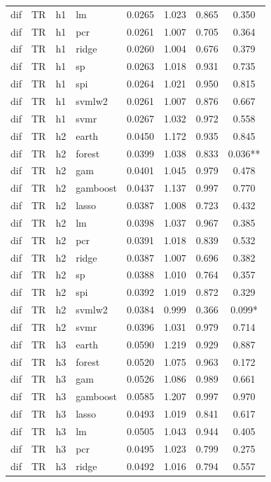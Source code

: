 \begin{ThreePartTable}
\begin{longtable}[t]{llclcccc}
dif & TR & h1 & lm & 0.0265 & 1.023 & 0.865 & 0.350\\
dif & TR & h1 & pcr & 0.0261 & 1.007 & 0.705 & 0.364\\
dif & TR & h1 & ridge & 0.0260 & 1.004 & 0.676 & 0.379\\
dif & TR & h1 & sp & 0.0263 & 1.018 & 0.931 & 0.735\\
dif & TR & h1 & spi & 0.0264 & 1.021 & 0.950 & 0.815\\
dif & TR & h1 & svmlw2 & 0.0261 & 1.007 & 0.876 & 0.667\\
dif & TR & h1 & svmr & 0.0267 & 1.032 & 0.972 & 0.558\\
\addlinespace
dif & TR & h2 & earth & 0.0450 & 1.172 & 0.935 & 0.845\\
dif & TR & h2 & forest & 0.0399 & 1.038 & 0.833 & 0.036**\\
dif & TR & h2 & gam & 0.0401 & 1.045 & 0.979 & 0.478\\
dif & TR & h2 & gamboost & 0.0437 & 1.137 & 0.997 & 0.770\\
dif & TR & h2 & lasso & 0.0387 & 1.008 & 0.723 & 0.432\\
dif & TR & h2 & lm & 0.0398 & 1.037 & 0.967 & 0.385\\
dif & TR & h2 & pcr & 0.0391 & 1.018 & 0.839 & 0.532\\
dif & TR & h2 & ridge & 0.0387 & 1.007 & 0.696 & 0.382\\
dif & TR & h2 & sp & 0.0388 & 1.010 & 0.764 & 0.357\\
dif & TR & h2 & spi & 0.0392 & 1.019 & 0.872 & 0.329\\
dif & TR & h2 & svmlw2 & 0.0384 & 0.999 & 0.366 & 0.099*\\
dif & TR & h2 & svmr & 0.0396 & 1.031 & 0.979 & 0.714\\
\addlinespace
dif & TR & h3 & earth & 0.0590 & 1.219 & 0.929 & 0.887\\
dif & TR & h3 & forest & 0.0520 & 1.075 & 0.963 & 0.172\\
dif & TR & h3 & gam & 0.0526 & 1.086 & 0.989 & 0.661\\
dif & TR & h3 & gamboost & 0.0585 & 1.207 & 0.997 & 0.970\\
dif & TR & h3 & lasso & 0.0493 & 1.019 & 0.841 & 0.617\\
dif & TR & h3 & lm & 0.0505 & 1.043 & 0.944 & 0.405\\
dif & TR & h3 & pcr & 0.0495 & 1.023 & 0.799 & 0.275\\
dif & TR & h3 & ridge & 0.0492 & 1.016 & 0.794 & 0.557\\

\end{longtable}
\end{ThreePartTable}
